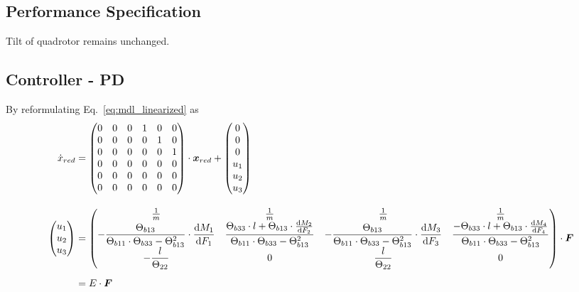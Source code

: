 \subsection{Performance Specification}
Tilt of quadrotor remains unchanged. 
\clearpage

\subsection{Controller - PD}
By reformulating Eq.~\ref{eq:mdl_linearized} as
\begin{align*}
\dot{x}_{red} &= \begin{pmatrix} 0 & 0 & 0 & 1 & 0 & 0 \\
	0 & 0 & 0 & 0 & 1 & 0 \\
	0 & 0 & 0 & 0 & 0 & 1 \\
	0 & 0 & 0 & 0 & 0 & 0 \\
	0 & 0 & 0 & 0 & 0 & 0 \\
	0 & 0 & 0 & 0 & 0 & 0 
\end{pmatrix} \cdot \boldsymbol{x}_{red} +
\begin{pmatrix}
	0   \\
	0   \\
	0   \\
	u_1 \\
	u_2 \\
	u_3 
\end{pmatrix}
\\[1em]
\begin{pmatrix} u_1 \\ u_2 \\ u_3 \end{pmatrix} &= 
\begin{pmatrix}
	\frac{1}{m} & \frac{1}{m} & \frac{1}{m} & \frac{1}{m} \\
	-\dfrac{\Theta_{b13}}{\Theta_{b11} \cdot \Theta_{b33} - \Theta_{b13}^2} \cdot \dfrac{\text{d}M_1}{\text{d}F_1} & \dfrac{\Theta_{b33}\cdot l + \Theta_{b13} \cdot \frac{\text{d}M_2}{\text{d}F_2} }{\Theta_{b11} \cdot \Theta_{b33} - \Theta_{b13}^2}  & -\dfrac{\Theta_{b13}}{\Theta_{b11} \cdot \Theta_{b33} - \Theta_{b13}^2} \cdot \dfrac{\text{d}M_3}{\text{d}F_3} & \dfrac{-\Theta_{b33}\cdot l + \Theta_{b13} \cdot \frac{\text{d}M_4}{\text{d}F_4} }{\Theta_{b11} \cdot \Theta_{b33} - \Theta_{b13}^2} 
	\\
	-\dfrac{l}{\Theta_{22}} & 0 & \dfrac{l}{\Theta_{22}} & 0
\end{pmatrix} \cdot \boldsymbol{F}
\\[0.5em]
&= E \cdot \boldsymbol{F}
\end{align*}
